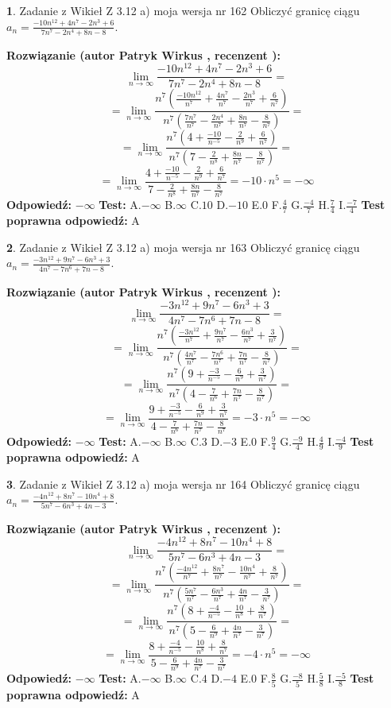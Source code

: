 \documentclass[12pt, a4paper]{article}
\theoremstyle{definition} %
\newtheorem{zad}{}
\newcommand{\zadStart}[1]{\begin{zad}#1\newline}
\newcommand{\zadStop}{\end{zad}}
\newcommand{\rozwStart}[2]{\noindent \textbf{Rozwiązanie (autor #1 , recenzent #2): }\newline}
\newcommand{\rozwStop}{\newline}
\newcommand{\odpStart}{\noindent \textbf{Odpowiedź:}\newline}
\newcommand{\odpStop}{\newline}
\newcommand{\testStart}{\noindent \textbf{Test:}\newline}
\newcommand{\testStop}{\newline}
\newcommand{\kluczStart}{\noindent \textbf{Test poprawna odpowiedź:}\newline}
\newcommand{\kluczStop}{\newline}
\begin{document}
\zadStart{Zadanie z Wikieł Z 3.12 a) moja wersja nr 162}
Obliczyć granicę ciągu $a_{n}=\frac{-10n^{12}+4n^{7}-2n^{3}+6}{7n^{7}-2n^{4}+8n-8}$.
\zadStop
\rozwStart{Patryk Wirkus}{}
$$\lim\limits_{n\to\infty}\frac{-10n^{12}+4n^{7}-2n^{3}+6}{7n^{7}-2n^{4}+8n-8}=$$
$$=\lim\limits_{n\to\infty}\frac{n^{7}\left(\frac{-10n^{12}}{n^{7}}+\frac{4n^{7}}{n^{7}}-\frac{2n^{3}}{n^{7}}+\frac{6}{n^{7}}\right)}{n^{7}\left(\frac{7n^{7}}{n^{7}}-\frac{2n^{4}}{n^{7}}+\frac{8n}{n^{7}}-\frac{8}{n^{7}}\right)}=$$
$$=\lim\limits_{n\to\infty}\frac{n^{7}\left(4+\frac{-10}{n^{-5}}-\frac{2}{n^{9}}+\frac{6}{n^{7}}\right)}
{n^{7}\left(7-\frac{2}{n^{8}}+\frac{8n}{n^{7}}-\frac{8}{n^{7}}\right)}=$$
$$=\lim\limits_{n\to\infty}\frac{4+\frac{-10}{n^{-5}}-\frac{2}{n^{9}}+\frac{6}{n^{7}}}{7-\frac{2}{n^{8}}+\frac{8n}{n^{7}}-\frac{8}{n^{7}}}=-10\cdot n^{5} = -\infty$$
\rozwStop
\odpStart
$-\infty$
\odpStop
\testStart
A.$-\infty$
B.$\infty$
C.$10$
D.$-10$
E.$0$
F.$\frac{4}{7}$
G.$\frac{-4}{7}$
H.$\frac{7}{4}$
I.$\frac{-7}{4}$
\testStop
\kluczStart
A
\kluczStop



\zadStart{Zadanie z Wikieł Z 3.12 a) moja wersja nr 163}
Obliczyć granicę ciągu $a_{n}=\frac{-3n^{12}+9n^{7}-6n^{3}+3}{4n^{7}-7n^{6}+7n-8}$.
\zadStop
\rozwStart{Patryk Wirkus}{}
$$\lim\limits_{n\to\infty}\frac{-3n^{12}+9n^{7}-6n^{3}+3}{4n^{7}-7n^{6}+7n-8}=$$
$$=\lim\limits_{n\to\infty}\frac{n^{7}\left(\frac{-3n^{12}}{n^{7}}+\frac{9n^{7}}{n^{7}}-\frac{6n^{3}}{n^{7}}+\frac{3}{n^{7}}\right)}{n^{7}\left(\frac{4n^{7}}{n^{7}}-\frac{7n^{6}}{n^{7}}+\frac{7n}{n^{7}}-\frac{8}{n^{7}}\right)}=$$
$$=\lim\limits_{n\to\infty}\frac{n^{7}\left(9+\frac{-3}{n^{-5}}-\frac{6}{n^{9}}+\frac{3}{n^{7}}\right)}
{n^{7}\left(4-\frac{7}{n^{6}}+\frac{7n}{n^{7}}-\frac{8}{n^{7}}\right)}=$$
$$=\lim\limits_{n\to\infty}\frac{9+\frac{-3}{n^{-5}}-\frac{6}{n^{9}}+\frac{3}{n^{7}}}{4-\frac{7}{n^{6}}+\frac{7n}{n^{7}}-\frac{8}{n^{7}}}=-3\cdot n^{5} = -\infty$$
\rozwStop
\odpStart
$-\infty$
\odpStop
\testStart
A.$-\infty$
B.$\infty$
C.$3$
D.$-3$
E.$0$
F.$\frac{9}{4}$
G.$\frac{-9}{4}$
H.$\frac{4}{9}$
I.$\frac{-4}{9}$
\testStop
\kluczStart
A
\kluczStop



\zadStart{Zadanie z Wikieł Z 3.12 a) moja wersja nr 164}
Obliczyć granicę ciągu $a_{n}=\frac{-4n^{12}+8n^{7}-10n^{4}+8}{5n^{7}-6n^{3}+4n-3}$.
\zadStop
\rozwStart{Patryk Wirkus}{}
$$\lim\limits_{n\to\infty}\frac{-4n^{12}+8n^{7}-10n^{4}+8}{5n^{7}-6n^{3}+4n-3}=$$
$$=\lim\limits_{n\to\infty}\frac{n^{7}\left(\frac{-4n^{12}}{n^{7}}+\frac{8n^{7}}{n^{7}}-\frac{10n^{4}}{n^{7}}+\frac{8}{n^{7}}\right)}{n^{7}\left(\frac{5n^{7}}{n^{7}}-\frac{6n^{3}}{n^{7}}+\frac{4n}{n^{7}}-\frac{3}{n^{7}}\right)}=$$
$$=\lim\limits_{n\to\infty}\frac{n^{7}\left(8+\frac{-4}{n^{-5}}-\frac{10}{n^{8}}+\frac{8}{n^{7}}\right)}
{n^{7}\left(5-\frac{6}{n^{9}}+\frac{4n}{n^{7}}-\frac{3}{n^{7}}\right)}=$$
$$=\lim\limits_{n\to\infty}\frac{8+\frac{-4}{n^{-5}}-\frac{10}{n^{8}}+\frac{8}{n^{7}}}{5-\frac{6}{n^{9}}+\frac{4n}{n^{7}}-\frac{3}{n^{7}}}=-4\cdot n^{5} = -\infty$$
\rozwStop
\odpStart
$-\infty$
\odpStop
\testStart
A.$-\infty$
B.$\infty$
C.$4$
D.$-4$
E.$0$
F.$\frac{8}{5}$
G.$\frac{-8}{5}$
H.$\frac{5}{8}$
I.$\frac{-5}{8}$
\testStop
\kluczStart
A
\kluczStop
\end{document}
